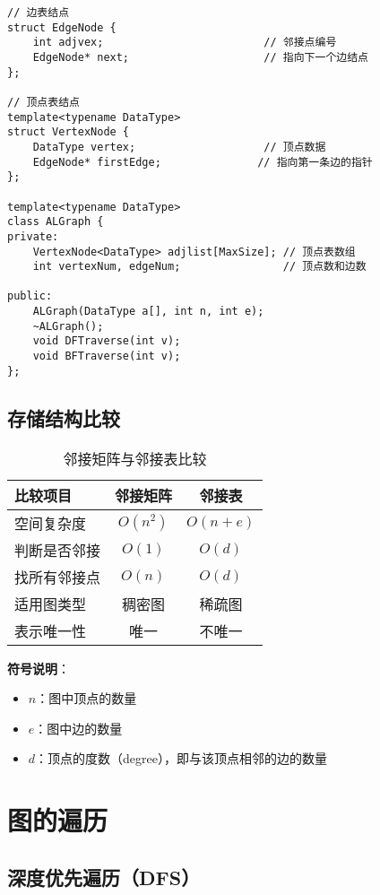 \documentclass[12pt,a4paper]{amsart}
\begin{document}
\begin{lstlisting}[caption=邻接表结构定义]
// 边表结点
struct EdgeNode {
    int adjvex;                         // 邻接点编号
    EdgeNode* next;                     // 指向下一个边结点
};

// 顶点表结点
template<typename DataType>
struct VertexNode {
    DataType vertex;                    // 顶点数据
    EdgeNode* firstEdge;               // 指向第一条边的指针
};

template<typename DataType>
class ALGraph {
private:
    VertexNode<DataType> adjlist[MaxSize]; // 顶点表数组
    int vertexNum, edgeNum;                // 顶点数和边数
    
public:
    ALGraph(DataType a[], int n, int e);
    ~ALGraph();
    void DFTraverse(int v);
    void BFTraverse(int v);
};
\end{lstlisting}

\subsection{存储结构比较}

\begin{table}[h]
\centering
\begin{tabular}{lcc}
\toprule
\textbf{比较项目} & \textbf{邻接矩阵} & \textbf{邻接表} \\
\midrule
空间复杂度 & $O(n^2)$ & $O(n+e)$ \\
判断是否邻接 & $O(1)$ & $O(d)$ \\
找所有邻接点 & $O(n)$ & $O(d)$ \\
适用图类型 & 稠密图 & 稀疏图 \\
表示唯一性 & 唯一 & 不唯一 \\
\bottomrule
\end{tabular}
\caption{邻接矩阵与邻接表比较}
\end{table}

\textbf{符号说明}：
\begin{itemize}
    \item $n$：图中顶点的数量
    \item $e$：图中边的数量
    \item $d$：顶点的度数（degree），即与该顶点相邻的边的数量
\end{itemize}

\section{图的遍历}

\subsection{深度优先遍历（DFS）}
\end{document}
